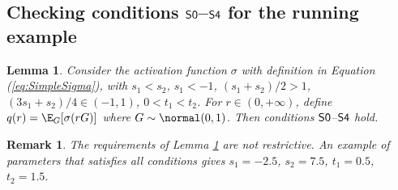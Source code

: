 \documentclass[11pt]{article}
\newtheorem{lemma}{Lemma}
\newtheorem{remark}{Remark}[section]
\begin{document}
\subsection{Checking conditions ${\sf S0}$--${\sf S4}$ for the running example}
\label{sec:AssumptionsExample}

\begin{lemma}\label{lem:unique_solution_condition}
Consider the activation function $\sigma$ with definition in Equation (\ref{eq:SimpleSigma}), with $s_1 < s_2$, $s_1 < -1$, $(s_1 + s_2)/2 > 1$, $(3s_1 + s_2)/4 \in (-1, 1)$, $0 < t_1 < t_2$. For $r \in (0, +\infty)$, define $q(r) = \E_G[\sigma(r G)]$ where $G \sim \normal(0, 1)$. Then conditions ${\sf S0}$--${\sf S4}$ hold. 
\end{lemma}

\begin{remark}
The requirements of Lemma \ref{lem:unique_solution_condition} are not restrictive. An example of parameters that satisfies all conditions gives $s_1 = -2.5$, $s_2 = 7.5$, $t_1 = 0.5$, $t_2 = 1.5$. 
\end{remark}
\end{document}

